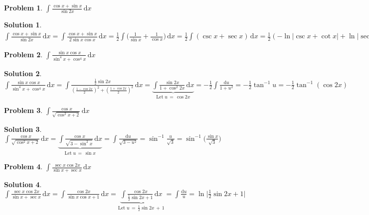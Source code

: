 \documentclass[11pt,a4paper]{article}
\newcommand{\ds}{\displaystyle}
\theoremstyle{definition}
\newtheorem*{problem}{Problem}
\newtheorem*{solution}{Solution}
\begin{document}
\begin{problem}
  $\ds\int\!\frac{\cos x + \sin x}{\sin 2x}\,\text{d}x$
\end{problem}

\begin{solution}
  $\ds\int\!\frac{\cos x + \sin x}{\sin 2x}\,\text{d}x = \int\!\frac{\cos x + \sin x}{2\sin x\cos x}\,\text{d}x = \frac{1}{2}\int\!\Big(\frac{1}{\sin x} + \frac{1}{\cos x}\Big)\,\text{d}x = \frac{1}{2}\int\!(\csc x + \sec x)\,\text{d}x = \frac{1}{2}(-\ln|\csc x + \cot x| + \ln|\sec x + \tan x|) = \frac{1}{2}\ln\Big|\frac{\sec x + \tan x}{\csc x + \cot x}\Big| = \frac{1}{2}\ln\Big|\frac{(1 + \sin x)\sin x}{(1 + \cos x)\cos x}\Big|$
\end{solution}

\begin{problem}
  $\ds\int\!\frac{\sin x \cos x}{\sin^4\!x + \cos^4\!x}\,\text{d}x$
\end{problem}

\begin{solution}
  $\ds\int\!\frac{\sin x \cos x}{\sin^4\!x + \cos^4\!x}\,\text{d}x = \int\!\frac{\frac{1}{2}\sin 2x}{(\frac{1 - \cos 2x}{2})^2 + (\frac{1 + \cos 2x}{2})^2}\,\text{d}x = \underbrace{\int\!\frac{\sin 2x}{1 + \cos^2\!2x}\,\text{d}x}_{\text{Let}\;u\,=\,\cos 2x} = -\frac{1}{2}\int\!\frac{\text{d}u}{1 + u^2} = -\frac{1}{2}\tan^{-1}u = -\frac{1}{2}\tan^{-1}(\cos 2x)$
\end{solution}

\begin{problem}
  $\ds\int\!\frac{\cos x}{\sqrt{\cos^2\!x + 2}} \,\text{d}x$
\end{problem}

\begin{solution}
  $\ds\int\!\frac{\cos x}{\sqrt{\cos^2\!x + 2}} \,\text{d}x = \underbrace{\int\!\frac{\cos x}{\sqrt{3 - \sin^2\!x}} \,\text{d}x}_{\text{Let}\;u\,=\,\sin x} = \int\!\frac{\text{d}u}{\sqrt{3 - u^2}} = \sin^{-1}\!\frac{u}{\sqrt{3}} = \sin^{-1}\!\Big(\frac{\sin x}{\sqrt{3}}\Big)$
\end{solution}

\begin{problem}
  $\ds\int\!\frac{\sec x \cos 2x}{\sin x + \sec x}\,\text{d}x$
\end{problem}

\begin{solution}
  $\ds\int\!\frac{\sec x \cos 2x}{\sin x + \sec x}\,\text{d}x = \int\!\frac{\cos 2x}{\sin x\cos x + 1}\,\text{d}x = \underbrace{\int\!\frac{\cos 2x}{\frac{1}{2}\sin 2x + 1}\,\text{d}x}_{\text{Let}\;u\,=\,\frac{1}{2}\sin 2x\,+\,1} = \int\!\frac{\text{d}u}{u} = \ln\Big|\frac{1}{2}\sin 2x + 1\Big|$
\end{solution}
\end{document}
